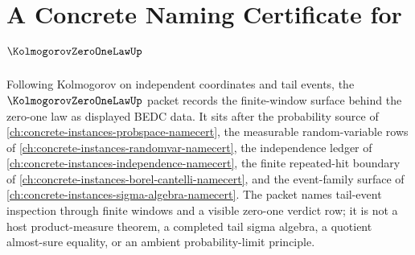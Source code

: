 \chapter{A Concrete Naming Certificate for $\KolmogorovZeroOneLawUp$}
\label{ch:concrete-instances-kolmogorov-zero-one-law-namecert}

Following Kolmogorov on independent coordinates and tail events, the $\KolmogorovZeroOneLawUp$ packet records the finite-window surface behind the zero-one law as displayed BEDC data. It sits after the probability source of \autoref{ch:concrete-instances-probspace-namecert}, the measurable random-variable rows of \autoref{ch:concrete-instances-randomvar-namecert}, the independence ledger of \autoref{ch:concrete-instances-independence-namecert}, the finite repeated-hit boundary of \autoref{ch:concrete-instances-borel-cantelli-namecert}, and the event-family surface of \autoref{ch:concrete-instances-sigma-algebra-namecert}. The packet names tail-event inspection through finite windows and a visible zero-one verdict row; it is not a host product-measure theorem, a completed tail sigma algebra, a quotient almost-sure equality, or an ambient probability-limit principle.

